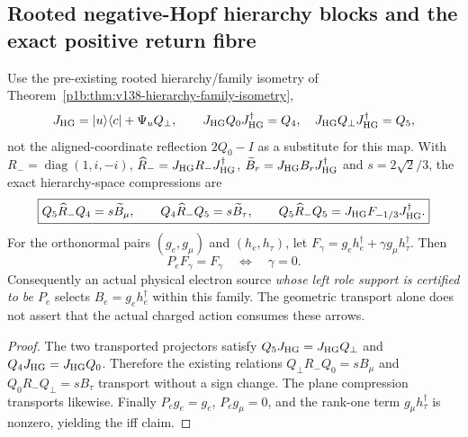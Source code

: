 \documentclass[12pt,a4paper]{article}
\begin{document}
\subsection{Rooted negative-Hopf hierarchy blocks and the exact positive return fibre}
\label{p6:sec:v229-rooted-charged-converse}

\begin{theorem}
\label{p6:thm:v229-rooted-negative-hopf-hierarchy-blocks}
Use the pre-existing rooted hierarchy/family isometry of
Theorem~\ref{p1b:thm:v138-hierarchy-family-isometry},
\[
 J_{\rm HG}=|u\rangle\langle c|+\Psi_uQ_\perp,
 \qquad J_{\rm HG}Q_0J_{\rm HG}^\dagger=Q_4,
 \quad J_{\rm HG}Q_\perp J_{\rm HG}^\dagger=Q_5,
\]
not the aligned-coordinate reflection $2Q_0-I$ as a substitute for this
map.  With $R_-=\operatorname{diag}(1,i,-i)$,
$\widehat R_-=J_{\rm HG}R_-J_{\rm HG}^\dagger$,
$\widetilde B_r=J_{\rm HG}B_rJ_{\rm HG}^\dagger$ and
$s=2\sqrt2/3$, the exact hierarchy-space compressions are
\[
 \boxed{Q_5\widehat R_-Q_4=s\widetilde B_\mu,\qquad
 Q_4\widehat R_-Q_5=s\widetilde B_\tau,\qquad
 Q_5\widehat R_-Q_5=J_{\rm HG}F_{-1/3}J_{\rm HG}^\dagger.}
\]
For the orthonormal pairs $(g_e,g_\mu)$ and $(h_e,h_\tau)$, let
$F_\gamma=g_eh_e^\dagger+\gamma g_\mu h_\tau^\dagger$.  Then
\[
 \boxed{P_eF_\gamma=F_\gamma\quad\Longleftrightarrow\quad\gamma=0.}
\]
Consequently an actual physical electron source \emph{whose left role
support is certified to be $P_e$} selects $B_e=g_eh_e^\dagger$ within
this family.  The geometric transport alone does not assert that the
actual charged action consumes these arrows.
\end{theorem}
\begin{proof}
The two transported projectors satisfy $Q_5J_{\rm HG}=J_{\rm HG}Q_\perp$
and $Q_4J_{\rm HG}=J_{\rm HG}Q_0$.  Therefore the existing relations
$Q_\perp R_-Q_0=sB_\mu$ and $Q_0R_-Q_\perp=sB_\tau$
transport without a sign change.  The plane compression transports
likewise.  Finally $P_eg_e=g_e$, $P_eg_\mu=0$, and the rank-one term
$g_\mu h_\tau^\dagger$ is nonzero, yielding the iff claim.
\end{proof}
\end{document}

